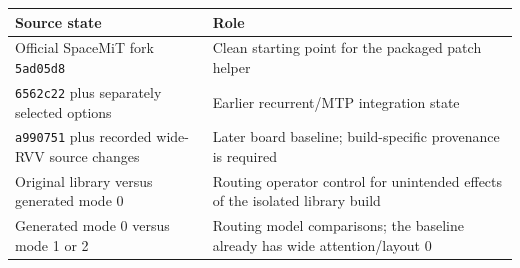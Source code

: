 \documentclass[10pt,a4paper]{article}
\begin{document}
\begin{longtable}[]{@{}ll@{}}
\toprule
\begin{minipage}[b]{0.47\columnwidth}\raggedright
Source state\strut
\end{minipage} & \begin{minipage}[b]{0.47\columnwidth}\raggedright
Role\strut
\end{minipage}\tabularnewline
\midrule
\endhead
\begin{minipage}[t]{0.47\columnwidth}\raggedright
Official SpaceMiT fork \nolinkurl{5ad05d8}\strut
\end{minipage} & \begin{minipage}[t]{0.47\columnwidth}\raggedright
Clean starting point for the packaged patch helper\strut
\end{minipage}\tabularnewline
\begin{minipage}[t]{0.47\columnwidth}\raggedright
\nolinkurl{6562c22} plus separately selected options\strut
\end{minipage} & \begin{minipage}[t]{0.47\columnwidth}\raggedright
Earlier recurrent/MTP integration state\strut
\end{minipage}\tabularnewline
\begin{minipage}[t]{0.47\columnwidth}\raggedright
\nolinkurl{a990751} plus recorded wide-RVV source changes\strut
\end{minipage} & \begin{minipage}[t]{0.47\columnwidth}\raggedright
Later board baseline; build-specific provenance is required\strut
\end{minipage}\tabularnewline
\begin{minipage}[t]{0.47\columnwidth}\raggedright
Original library versus generated mode 0\strut
\end{minipage} & \begin{minipage}[t]{0.47\columnwidth}\raggedright
Routing operator control for unintended effects of the isolated library
build\strut
\end{minipage}\tabularnewline
\begin{minipage}[t]{0.47\columnwidth}\raggedright
Generated mode 0 versus mode 1 or 2\strut
\end{minipage} & \begin{minipage}[t]{0.47\columnwidth}\raggedright
Routing model comparisons; the baseline already has wide
attention/layout 0\strut
\end{minipage}\tabularnewline
\bottomrule
\end{longtable}
\end{document}
